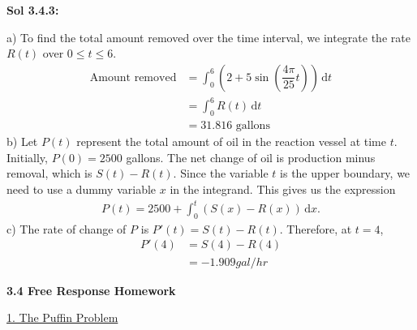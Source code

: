 \begin{tcolorbox}[solution]
    \textbf{Sol 3.4.3: } \par
    a) To find the total amount removed over the time interval, we integrate the rate $R(t)$ over $0 \leq t \leq 6$. \begin{align*}
        \text{Amount removed} &= \int_0^6 \left(2 + 5\sin \left(\dfrac{4\pi}{25}t\right) \right) \,\mathrm{d}t \\[11pt]
        & = \int_0^6 R(t) \,\mathrm{d}t \\[11pt]
        & = \boxed{31.816 \text{ gallons}}
    \end{align*}
    b) Let $P(t)$ represent the total amount of oil in the reaction vessel at time $t$. Initially, $P(0) = 2500$ gallons. The net change of oil is production minus removal, which is $S(t) - R(t)$. Since the variable $t$ is the upper boundary, we need to use a dummy variable $x$ in the integrand. This gives us the expression \begin{align*}
        \boxed{P(t) = 2500 + \int_0^t (S(x) - R(x)) \,\mathrm{d}x}.
    \end{align*}
    c) The rate of change of $P$ is $P'(t) = S(t) - R(t)$. Therefore, at $t = 4$, \begin{align*}
        P'(4) &= S(4) - R(4) \\[11pt]
        & = \boxed{-1.909 \si{gal \per hr}}
    \end{align*}
\end{tcolorbox}

\newpage

\textbf{\large{3.4 Free Response Homework}} \par

\begin{center}
    \underline{1. The Puffin Problem}
\end{center}

